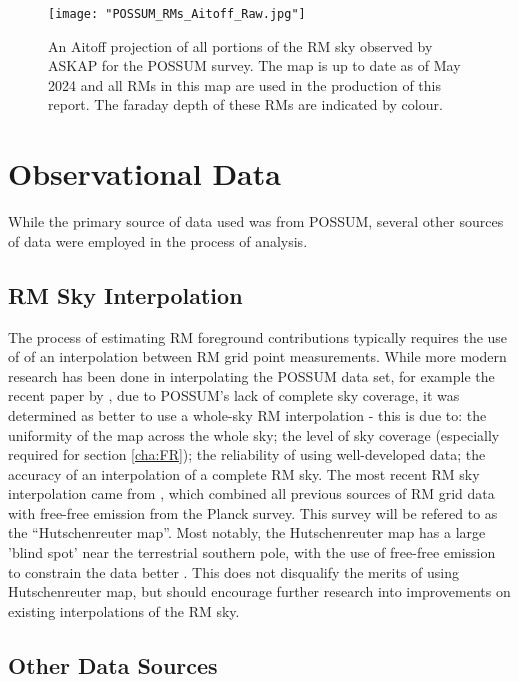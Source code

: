 \begin{figure}
    \texttt{[image: "POSSUM\_RMs\_Aitoff\_Raw.jpg"]}
    \centering
    \caption{An Aitoff projection of all portions of the RM sky observed by ASKAP for the POSSUM survey. The map is up to date as of May 2024 and all RMs in this map are used in the production of this report. The faraday depth of these RMs are indicated by colour.}
    \label{fig:rm_map}
\end{figure}

\section{Observational Data}
\label{sec:data}

While the primary source of data used was from POSSUM, several other sources of data were employed in the process of analysis.

\subsection{RM Sky Interpolation}
\label{ssec:legacy}

The process of estimating RM foreground contributions typically requires the use of of an interpolation between RM grid point measurements. While more modern research has been done in interpolating the POSSUM data set, for example the recent paper by \cite{ID58}, due to POSSUM's lack of complete sky coverage, it was determined as better to use a whole-sky RM interpolation - this is due to: the uniformity of the map across the whole sky; the level of sky coverage (especially required for section \ref{cha:FR}); the reliability of using well-developed data; the accuracy of an interpolation of a complete RM sky. The most recent RM sky interpolation came from \cite{ID44, ID45}, which combined all previous sources of RM grid data with free-free emission from the Planck survey. This survey will be refered to as the “Hutschenreuter map”. Most notably, the Hutschenreuter map has a large 'blind spot' near the terrestrial southern pole, with the use of free-free emission to constrain the data better \citep{ID44, ID45}. This does not disqualify the merits of using Hutschenreuter map, but should encourage further research into improvements on existing interpolations of the RM sky.

\subsection{Other Data Sources}
\label{ssec:other_data}


